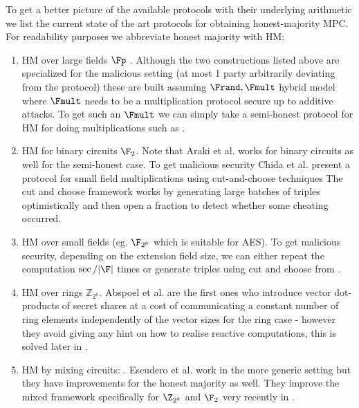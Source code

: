 To get a better picture of the available protocols with their underlying
arithmetic we list the current state of the art protocols for obtaining
honest-majority MPC. For readability purposes we abbreviate honest majority
with HM:

\begin{enumerate}
  \item HM over large fields $\Fp$ \cite{CCS:LinNof17,C:CGHIKL18}. Although
  the two constructions listed above are specialized for the malicious
  setting (at most 1 party arbitrarily deviating from the protocol) these are
  built assuming $\Frand, \Fmult$ hybrid model where $\Fmult$ needs to be a
  multiplication protocol secure up to additive attacks. To get such an
  $\Fmult$ we can simply take
  a semi-honest protocol for HM for doing multiplications such as \cite{CCS:AFLNO16}.
  \item HM for binary circuits $\F_2$. Note that Araki et al. \cite{CCS:AFLNO16}
  works for binary circuits as well for the semi-honest case.
  To get malicious security Chida et al. \cite{C:CGHIKL18} present a protocol
  for small field multiplications using cut-and-choose techniques The cut and
  choose framework works by generating large batches of triples
  optimistically and then open a fraction to detect whether some cheating
  occurred.
  \item HM over small fields (eg. $\F_{2^8}$ which is suitable for AES). To
  get malicious security, depending on the extension field size, we can
  either repeat the computation $\sec/|\F|$ times or generate triples using cut and choose
  from \cite{C:CGHIKL18}.
  \item HM over rings $\mathbb{Z}_{2^k}$. Abspoel et al. \cite{EPRINT:ADEN19}
  are the first ones who introduce vector dot-products of secret shares at a cost of
  communicating a constant number of ring elements independently of the vector sizes
  for the ring case - however they avoid giving any hint on how to realise
  reactive computations, this is solved later in \cite{cryptoeprint:2020:1330}.
  \item HM by mixing circuits: \cite{CCS:MohRin18,cryptoeprint:2020:1330}.
  Escudero et al. \cite{C:EGKRS20} work in the more generic setting but they
  have
  improvements for the honest majority as well. They improve the mixed framework
  specifically for $\Z_{2^k}$ and $\F_2$ very recently in \cite{cryptoeprint:2020:1330}.

\end{enumerate}

